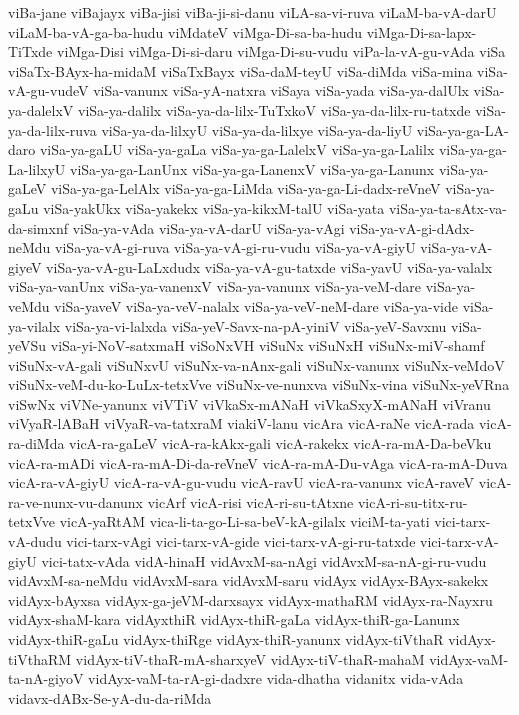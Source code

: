 {viBa-jane
viBajayx
viBa-jisi
viBa-ji-si-danu
viLA-sa-vi-ruva
viLaM-ba-vA-darU
viLaM-ba-vA-ga-ba-hudu
viMdateV
viMga-Di-sa-ba-hudu
viMga-Di-sa-lapx-TiTxde
viMga-Disi
viMga-Di-si-daru
viMga-Di-su-vudu
viPa-la-vA-gu-vAda
viSa
viSaTx-BAyx-ha-midaM
viSaTxBayx
viSa-daM-teyU
viSa-diMda
viSa-mina
viSa-vA-gu-vudeV
viSa-vanunx
viSa-yA-natxra
viSaya
viSa-yada
viSa-ya-dalUlx
viSa-ya-dalelxV
viSa-ya-dalilx
viSa-ya-da-lilx-TuTxkoV
viSa-ya-da-lilx-ru-tatxde
viSa-ya-da-lilx-ruva
viSa-ya-da-lilxyU
viSa-ya-da-lilxye
viSa-ya-da-liyU
viSa-ya-ga-LA-daro
viSa-ya-gaLU
viSa-ya-gaLa
viSa-ya-ga-LalelxV
viSa-ya-ga-Lalilx
viSa-ya-ga-La-lilxyU
viSa-ya-ga-LanUnx
viSa-ya-ga-LanenxV
viSa-ya-ga-Lanunx
viSa-ya-gaLeV
viSa-ya-ga-LelAlx
viSa-ya-ga-LiMda
viSa-ya-ga-Li-dadx-reVneV
viSa-ya-gaLu
viSa-yakUkx
viSa-yakekx
viSa-ya-kikxM-talU
viSa-yata
viSa-ya-ta-sAtx-va-da-simxnf
viSa-ya-vAda
viSa-ya-vA-darU
viSa-ya-vAgi
viSa-ya-vA-gi-dAdx-neMdu
viSa-ya-vA-gi-ruva
viSa-ya-vA-gi-ru-vudu
viSa-ya-vA-giyU
viSa-ya-vA-giyeV
viSa-ya-vA-gu-LaLxdudx
viSa-ya-vA-gu-tatxde
viSa-yavU
viSa-ya-valalx
viSa-ya-vanUnx
viSa-ya-vanenxV
viSa-ya-vanunx
viSa-ya-veM-dare
viSa-ya-veMdu
viSa-yaveV
viSa-ya-veV-nalalx
viSa-ya-veV-neM-dare
viSa-ya-vide
viSa-ya-vilalx
viSa-ya-vi-lalxda
viSa-yeV-Savx-na-pA-yiniV
viSa-yeV-Savxnu
viSa-yeVSu
viSa-yi-NoV-satxmaH
viSoNxVH
viSuNx
viSuNxH
viSuNx-miV-shamf
viSuNx-vA-gali
viSuNxvU
viSuNx-va-nAnx-gali
viSuNx-vanunx
viSuNx-veMdoV
viSuNx-veM-du-ko-LuLx-tetxVve
viSuNx-ve-nunxva
viSuNx-vina
viSuNx-yeVRna
viSwNx
viVNe-yanunx
viVTiV
viVkaSx-mANaH
viVkaSxyX-mANaH
viVranu
viVyaR-lABaH
viVyaR-va-tatxraM
viakiV-lanu
vicAra
vicA-raNe
vicA-rada
vicA-ra-diMda
vicA-ra-gaLeV
vicA-ra-kAkx-gali
vicA-rakekx
vicA-ra-mA-Da-beVku
vicA-ra-mADi
vicA-ra-mA-Di-da-reVneV
vicA-ra-mA-Du-vAga
vicA-ra-mA-Duva
vicA-ra-vA-giyU
vicA-ra-vA-gu-vudu
vicA-ravU
vicA-ra-vanunx
vicA-raveV
vicA-ra-ve-nunx-vu-danunx
vicArf
vicA-risi
vicA-ri-su-tAtxne
vicA-ri-su-titx-ru-tetxVve
vicA-yaRtAM
vica-li-ta-go-Li-sa-beV-kA-gilalx
viciM-ta-yati
vici-tarx-vA-dudu
vici-tarx-vAgi
vici-tarx-vA-gide
vici-tarx-vA-gi-ru-tatxde
vici-tarx-vA-giyU
vici-tatx-vAda
vidA-hinaH
vidAvxM-sa-nAgi
vidAvxM-sa-nA-gi-ru-vudu
vidAvxM-sa-neMdu
vidAvxM-sara
vidAvxM-saru
vidAyx
vidAyx-BAyx-sakekx
vidAyx-bAyxsa
vidAyx-ga-jeVM-darxsayx
vidAyx-mathaRM
vidAyx-ra-Nayxru
vidAyx-shaM-kara
vidAyxthiR
vidAyx-thiR-gaLa
vidAyx-thiR-ga-Lanunx
vidAyx-thiR-gaLu
vidAyx-thiRge
vidAyx-thiR-yanunx
vidAyx-tiVthaR
vidAyx-tiVthaRM
vidAyx-tiV-thaR-mA-sharxyeV
vidAyx-tiV-thaR-mahaM
vidAyx-vaM-ta-nA-giyoV
vidAyx-vaM-ta-rA-gi-dadxre
vida-dhatha
vidanitx
vida-vAda
vidavx-dABx-Se-yA-du-da-riMda
}
